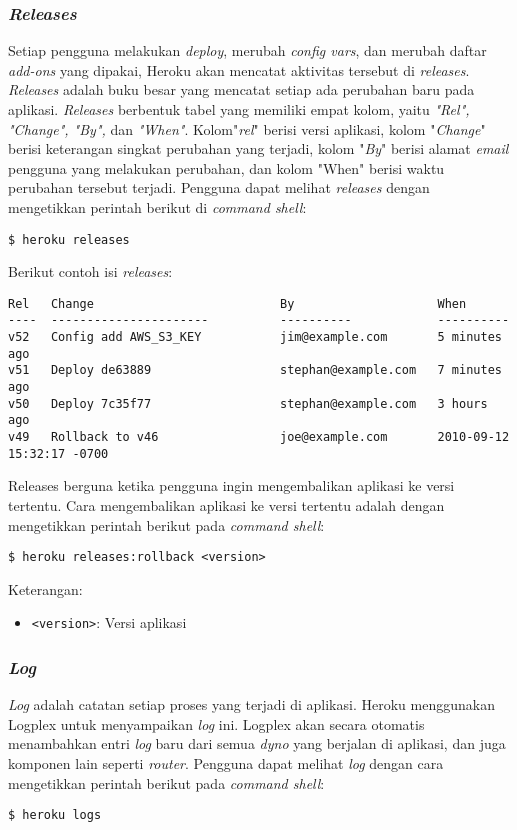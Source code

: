 \subsubsection{\textit{Releases}}
Setiap pengguna melakukan \textit{deploy}, merubah \textit{config vars}, dan merubah daftar \textit{add-ons} yang dipakai, Heroku akan mencatat aktivitas tersebut di \textit{releases}. \textit{Releases} adalah buku besar yang mencatat setiap ada perubahan baru pada aplikasi. \textit{Releases} berbentuk tabel yang memiliki empat kolom, yaitu \textit{"Rel", "Change", "By",} dan \textit{"When"}. Kolom"\textit{rel}" berisi versi aplikasi, kolom "\textit{Change}" berisi keterangan singkat perubahan yang terjadi, kolom "\textit{By}" berisi alamat \textit{email} pengguna yang melakukan perubahan, dan kolom "When" berisi waktu perubahan tersebut terjadi. Pengguna dapat melihat \textit{releases} dengan mengetikkan perintah berikut di \textit{command shell}:
\begin{lstlisting}
$ heroku releases
\end{lstlisting}

Berikut contoh isi \textit{releases}:
\begin{lstlisting}
Rel   Change                          By                    When
----  ----------------------          ----------            ----------
v52   Config add AWS_S3_KEY           jim@example.com       5 minutes ago
v51   Deploy de63889                  stephan@example.com   7 minutes ago
v50   Deploy 7c35f77                  stephan@example.com   3 hours ago
v49   Rollback to v46                 joe@example.com       2010-09-12 15:32:17 -0700
\end{lstlisting}

Releases berguna ketika pengguna ingin mengembalikan aplikasi ke versi tertentu. Cara mengembalikan aplikasi ke versi tertentu adalah dengan mengetikkan perintah berikut pada \textit{command shell}:
\begin{lstlisting}
$ heroku releases:rollback <version>
\end{lstlisting}
Keterangan:
\begin{itemize}
\item \texttt{<version>}: Versi aplikasi
\end{itemize}

\subsubsection{\textit{Log}}
\textit{Log} adalah catatan setiap proses yang terjadi di aplikasi. Heroku menggunakan Logplex untuk menyampaikan \textit{log} ini. Logplex akan secara otomatis menambahkan entri \textit{log} baru dari semua \textit{dyno} yang berjalan di aplikasi, dan juga komponen lain seperti \textit{router}. Pengguna dapat melihat \textit{log} dengan cara mengetikkan perintah berikut pada \textit{command shell}:
\begin{lstlisting}
$ heroku logs
\end{lstlisting}

